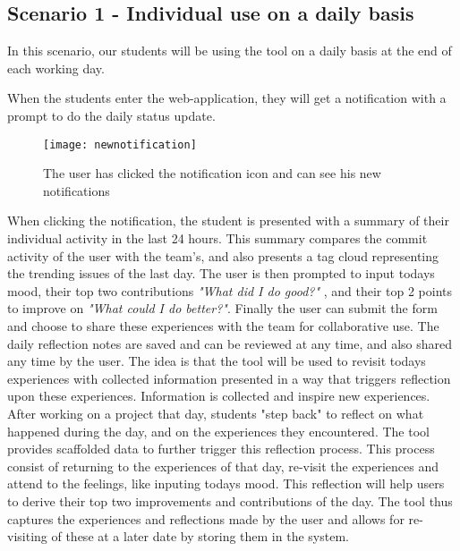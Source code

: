 \subsection{Scenario 1 - Individual use on a daily basis}
\label{scenario1}
In this scenario, our students will be using the tool on a daily basis at the end of each working day.

When the students enter the web-application, they will get a notification with a prompt to do the daily status update.

\begin{figure}[h!]
\label{newnotification}
\centering
	\texttt{[image: newnotification]}
\caption{The user has clicked the notification icon and can see his new notifications}
\end{figure}

  When clicking the notification, the student is presented with a summary of their individual activity in the last 24 hours.
  This summary compares the commit activity of the user with the team's, and also presents a tag cloud representing the trending issues of the last day. The user is then prompted to input todays mood, their top two contributions \emph{"What did I do good?"} , and their top 2 points to improve on \emph{"What could I do better?"}. Finally the user can submit the form and choose to share these experiences with the team for collaborative use. The daily reflection notes are saved and can be reviewed at any time, and also shared any time by the user. The idea is that the tool will be used to revisit todays experiences with collected information presented in a way that triggers reflection upon these experiences. Information is collected and inspire new experiences. After working on a project that day, students "step back" to reflect on what happened during the day, and on the experiences they encountered. The tool provides scaffolded data to further trigger this reflection process. This process consist of returning to the experiences of that day, re-visit the experiences and attend to the feelings, like inputing todays mood. This reflection will help users to derive their top two improvements and contributions of the day\citep{Krogstie2011}. The tool thus captures the experiences and reflections made by the user and allows for re-visiting of these at a later date by storing them in the system. 

